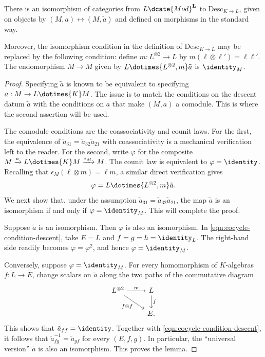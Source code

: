 \begin{lemma}\label{prop:descent-data-vs-comodule}
	There is an isomorphism of categories from $L\dcate{Mod}^{\mathbf{L}}$ to
	$\mathrm{Desc}_{K\to L}$, given on objects by
	$(M,a)\leftrightarrow(M,\tilde a)$ and defined on morphisms in the
	standard way.

	Moreover, the isomorphism condition in the definition of
	$\mathrm{Desc}_{K\to L}$ may be replaced by the following condition:
	define $m:L^{\otimes2}\to L$ by
	$m(\ell\otimes\ell')=\ell\ell'$. The endomorphism $M\to M$ given by
	$L\dotimes{L^{\otimes2},m}\tilde a$ is $\identity_M$.
\end{lemma}
\begin{proof}
	Specifying $\tilde a$ is known to be equivalent to specifying
	$a:M\to L\dotimes{K}M$. The issue is to match the conditions on the
	descent datum $\tilde a$ with the conditions on $a$ that make $(M,a)$ a
	comodule. This is where the second assertion will be used.

	The comodule conditions are the coassociativity and counit laws. For the
	first, the equivalence of $\tilde a_{31}=\tilde a_{32}\tilde a_{21}$ with
	coassociativity is a mechanical verification left to the reader. For the
	second, write $\varphi$ for the composite
	$M\xrightarrow{a}L\dotimes{K}M\xrightarrow{\epsilon_M}M$. The counit law
	is equivalent to $\varphi=\identity$. Recalling that
	$\epsilon_M(\ell\otimes m)=\ell m$, a similar direct verification gives
	\[ \varphi = L \dotimes{L^{\otimes 2}, m} \tilde{a}. \]
	We next show that, under the assumption
	$\tilde a_{31}=\tilde a_{32}\tilde a_{21}$, the map $\tilde a$ is an
	isomorphism if and only if $\varphi=\identity_M$. This will complete the
	proof.

	Suppose $\tilde a$ is an isomorphism. Then $\varphi$ is also an
	isomorphism. In \eqref{eqn:cocycle-condition-descent}, take $E=L$ and
	$f=g=h=\identity_L$. The right-hand side readily becomes
	$\varphi=\varphi^2$, and hence $\varphi=\identity_M$.

	Conversely, suppose $\varphi=\identity_M$. For every homomorphism of
	$K$-algebras $f:L\to E$, change scalars on $\tilde a$ along the two paths
	of the commutative diagram
	\[\begin{tikzcd}
		L^{\otimes 2} \arrow[rd, "{f \otimes f}"'] \arrow[r, "m"] & L \arrow[d, "f"] \\
		& E.
	\end{tikzcd}\]
	This shows that $\tilde a_{ff}=\identity$. Together with
	\eqref{eqn:cocycle-condition-descent}, it follows that
	$\tilde a_{fg}^{-1}=\tilde a_{gf}$ for every $(E,f,g)$. In particular,
	the ``universal version'' $\tilde a$ is also an isomorphism. This proves
	the lemma.
\end{proof}


